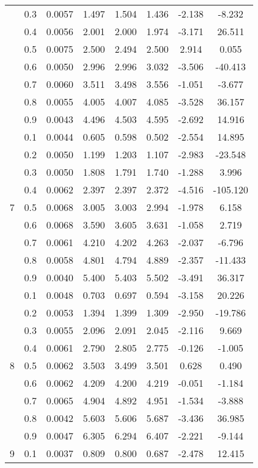 \documentclass[11pt,a4paper]{report}
\begin{document}
\begin{longtable}{ | c | c || c | c | c | c | c | c | }
 & 0.3 & 0.0057 & 1.497 & 1.504 & 1.436 & -2.138 & -8.232 \\
 & 0.4 & 0.0056 & 2.001 & 2.000 & 1.974 & -3.171 & 26.511 \\
 & 0.5 & 0.0075 & 2.500 & 2.494 & 2.500 & 2.914 & 0.055 \\
 & 0.6 & 0.0050 & 2.996 & 2.996 & 3.032 & -3.506 & -40.413 \\
 & 0.7 & 0.0060 & 3.511 & 3.498 & 3.556 & -1.051 & -3.677 \\
 & 0.8 & 0.0055 & 4.005 & 4.007 & 4.085 & -3.528 & 36.157 \\
 & 0.9 & 0.0043 & 4.496 & 4.503 & 4.595 & -2.692 & 14.916 \\
 \hline
\multirow{9}{*}{7} & 0.1 & 0.0044 & 0.605 & 0.598 & 0.502 & -2.554 & 14.895 \\
 & 0.2 & 0.0050 & 1.199 & 1.203 & 1.107 & -2.983 & -23.548 \\
 & 0.3 & 0.0050 & 1.808 & 1.791 & 1.740 & -1.288 & 3.996 \\
 & 0.4 & 0.0062 & 2.397 & 2.397 & 2.372 & -4.516 & -105.120 \\
 & 0.5 & 0.0068 & 3.005 & 3.003 & 2.994 & -1.978 & 6.158 \\
 & 0.6 & 0.0068 & 3.590 & 3.605 & 3.631 & -1.058 & 2.719 \\
 & 0.7 & 0.0061 & 4.210 & 4.202 & 4.263 & -2.037 & -6.796 \\
 & 0.8 & 0.0058 & 4.801 & 4.794 & 4.889 & -2.357 & -11.433 \\
 & 0.9 & 0.0040 & 5.400 & 5.403 & 5.502 & -3.491 & 36.317 \\
 \hline
\multirow{9}{*}{8} & 0.1 & 0.0048 & 0.703 & 0.697 & 0.594 & -3.158 & 20.226 \\
 & 0.2 & 0.0053 & 1.394 & 1.399 & 1.309 & -2.950 & -19.786 \\
 & 0.3 & 0.0055 & 2.096 & 2.091 & 2.045 & -2.116 & 9.669 \\
 & 0.4 & 0.0061 & 2.790 & 2.805 & 2.775 & -0.126 & -1.005 \\
 & 0.5 & 0.0062 & 3.503 & 3.499 & 3.501 & 0.628 & 0.490 \\
 & 0.6 & 0.0062 & 4.209 & 4.200 & 4.219 & -0.051 & -1.184 \\
 & 0.7 & 0.0065 & 4.904 & 4.892 & 4.951 & -1.534 & -3.888 \\
 & 0.8 & 0.0042 & 5.603 & 5.606 & 5.687 & -3.436 & 36.985 \\
 & 0.9 & 0.0047 & 6.305 & 6.294 & 6.407 & -2.221 & -9.144 \\
 \hline
\multirow{9}{*}{9} & 0.1 & 0.0037 & 0.809 & 0.800 & 0.687 & -2.478 & 12.415 \\

\end{longtable}
\end{document}
